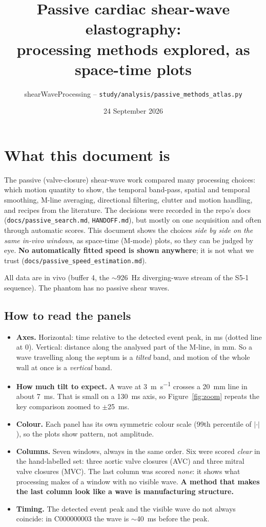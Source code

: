 \documentclass[10pt]{article}
\title{Passive cardiac shear-wave elastography:\\ processing methods explored, as space-time plots}
\author{shearWaveProcessing -- \texttt{study/analysis/passive\_methods\_atlas.py}}
\date{24 September 2026}
\begin{document}
\maketitle

\section*{What this document is}

The passive (valve-closure) shear-wave work compared many processing choices: which motion
quantity to show, the temporal band-pass, spatial and temporal smoothing, M-line averaging,
directional filtering, clutter and motion handling, and recipes from the literature. The
decisions were recorded in the repo's docs (\texttt{docs/passive\_search.md}, \texttt{HANDOFF.md}), but mostly
on one acquisition and often through automatic scores. This document shows the choices
\emph{side by side on the same in-vivo windows}, as space-time (M-mode) plots, so they can be
judged by eye. \textbf{No automatically fitted speed is shown anywhere}; it is not what we trust
(\texttt{docs/passive\_speed\_estimation.md}).

All data are in vivo (buffer 4, the $\sim$\SI{926}{\hertz} diverging-wave stream of the S5-1
sequence). The phantom has no passive shear waves.

\subsection*{How to read the panels}
\begin{itemize}
  \item \textbf{Axes.} Horizontal: time relative to the detected event peak, in ms (dotted line
    at 0). Vertical: distance along the analysed part of the M-line, in mm. So a wave travelling
    along the septum is a \emph{tilted} band, and motion of the whole wall at once is a
    \emph{vertical} band.
  \item \textbf{How much tilt to expect.} A wave at \SI{3}{\metre\per\second} crosses a \SI{20}{\milli\metre}
    line in about \SI{7}{\milli\second}. That is small on a \SI{130}{\milli\second} axis, so
    Figure~\ref{fig:zoom} repeats the key comparison zoomed to $\pm$\SI{25}{\milli\second}.
  \item \textbf{Colour.} Each panel has its own symmetric colour scale (99th percentile of
    $|\cdot|$), so the plots show pattern, not amplitude.
  \item \textbf{Columns.} Seven windows, always in the same order. Six were scored \emph{clear} in
    the hand-labelled set: three aortic valve closures (AVC) and three mitral valve closures (MVC).
    The last column was scored \emph{none}: it shows what processing makes of a window with no
    visible wave. \textbf{A method that makes the last column look like a wave is manufacturing structure.}
  \item \textbf{Timing.} The detected event peak and the visible wave do not always coincide:
    in C000000003 the wave is $\sim$\SI{40}{\milli\second} before the peak.
\end{itemize}
\end{document}

